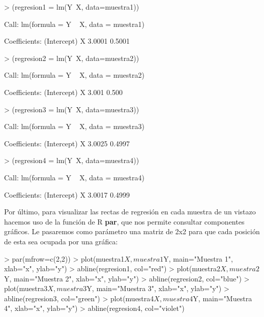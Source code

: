 \documentclass[a4paper]{article}
\begin{document}
\begin{Schunk}
\begin{Sinput}
> (regresion1 = lm(Y~X, data=muestra1))
\end{Sinput}
\begin{Soutput}
Call:
lm(formula = Y ~ X, data = muestra1)

Coefficients:
(Intercept)            X  
     3.0001       0.5001  
\end{Soutput}
\begin{Sinput}
> (regresion2 = lm(Y~X, data=muestra2))
\end{Sinput}
\begin{Soutput}
Call:
lm(formula = Y ~ X, data = muestra2)

Coefficients:
(Intercept)            X  
      3.001        0.500  
\end{Soutput}
\begin{Sinput}
> (regresion3 = lm(Y~X, data=muestra3))
\end{Sinput}
\begin{Soutput}
Call:
lm(formula = Y ~ X, data = muestra3)

Coefficients:
(Intercept)            X  
     3.0025       0.4997  
\end{Soutput}
\begin{Sinput}
> (regresion4 = lm(Y~X, data=muestra4))
\end{Sinput}
\begin{Soutput}
Call:
lm(formula = Y ~ X, data = muestra4)

Coefficients:
(Intercept)            X  
     3.0017       0.4999  
\end{Soutput}
\end{Schunk}

Por último, para visualizar las rectas de regresión en cada muestra de un vistazo hacemos uso de la función de R \textbf{par}, que nos permite consultar componentes gráficos. Le pasaremos como parámetro una matriz de 2x2 para que cada posición de esta sea ocupada por una gráfica:

\begin{Schunk}
\begin{Sinput}
> par(mfrow=c(2,2))
> plot(muestra1$X, muestra1$Y, main="Muestra 1", xlab="x", ylab="y")
> abline(regresion1, col="red")
> plot(muestra2$X, muestra2$Y, main="Muestra 2", xlab="x", ylab="y")
> abline(regresion2, col="blue")
> plot(muestra3$X, muestra3$Y, main="Muestra 3", xlab="x", ylab="y")
> abline(regresion3, col="green")
> plot(muestra4$X, muestra4$Y, main="Muestra 4", xlab="x", ylab="y")
> abline(regresion4, col="violet")
\end{Sinput}
\end{Schunk}
\end{document}
